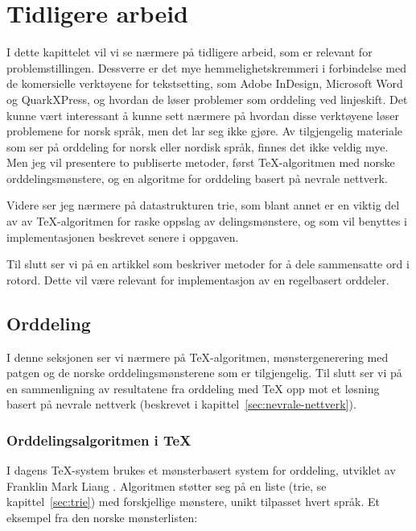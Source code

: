 \chapter{Tidligere arbeid}

I dette kapittelet vil vi se nærmere på tidligere arbeid, som er relevant for problemstillingen. Dessverre er det mye hemmelighetskremmeri i forbindelse med de komersielle verktøyene for tekstsetting, som Adobe InDesign, Microsoft Word og QuarkXPress, og hvordan de løser problemer som orddeling ved linjeskift. Det kunne vært interessant å kunne sett nærmere på hvordan disse verktøyene løser problemene for norsk språk, men det lar seg ikke gjøre. Av tilgjengelig materiale som ser på orddeling for norsk eller nordisk språk, finnes det ikke veldig mye. Men jeg vil presentere to publiserte metoder, først \TeX{}-algoritmen med norske orddelingsmønstere, og en algoritme for orddeling basert på nevrale nettverk.

Videre ser jeg nærmere på datastrukturen trie, som blant annet er en viktig del av av \TeX{}-algoritmen for raske oppslag av delingsmønstere, og som vil benyttes i implementasjonen beskrevet senere i oppgaven.

Til slutt ser vi på en artikkel som beskriver metoder for å dele sammensatte ord i rotord. Dette vil være relevant for implementasjon av en regelbasert orddeler.

\section{Orddeling}
\label{sec:tid-arb-orddeling}

I denne seksjonen ser vi nærmere på \TeX{}-algoritmen, mønstergenerering med patgen og de norske orddelingsmønsterene som er tilgjengelig. Til slutt ser vi på en sammenligning av resultatene fra orddeling med \TeX{} opp mot et løsning basert på nevrale nettverk (beskrevet i kapittel~\ref{sec:nevrale-nettverk}).

\subsection{Orddelingsalgoritmen i \TeX{}}

I dagens \TeX{}-system brukes et mønsterbasert system for orddeling, utviklet av Franklin Mark Liang \cite{liang1983word}. Algoritmen \cite[s.~449--450]{knuth1986texbook} støtter seg på en liste (trie, se kapittel~\ref{sec:trie}) med forskjellige mønstere, unikt tilpasset hvert språk. Et eksempel fra den norske mønsterlisten:

